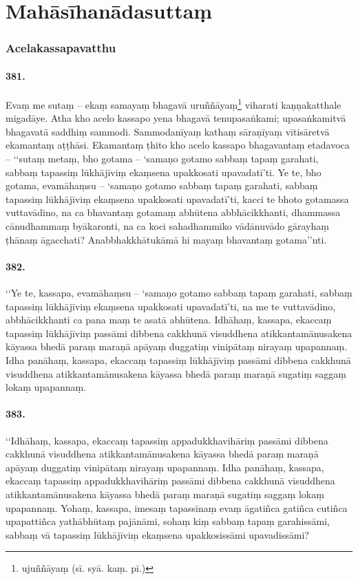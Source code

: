 \section{Mahāsīhanādasuttaṃ}

\subsubsection{Acelakassapavatthu}

\paragraph{381.} Evaṃ me sutaṃ – ekaṃ samayaṃ bhagavā uruññāyaṃ\footnote{ujuññāyaṃ (sī. syā. kaṃ. pī.)} viharati kaṇṇakatthale migadāye. Atha kho acelo kassapo yena bhagavā tenupasaṅkami; upasaṅkamitvā bhagavatā saddhiṃ sammodi. Sammodanīyaṃ kathaṃ sāraṇīyaṃ vītisāretvā ekamantaṃ aṭṭhāsi. Ekamantaṃ ṭhito kho acelo kassapo bhagavantaṃ etadavoca – ‘‘sutaṃ metaṃ, bho gotama – ‘samaṇo gotamo sabbaṃ tapaṃ garahati, sabbaṃ tapassiṃ lūkhājīviṃ ekaṃsena upakkosati upavadatī’ti. Ye te, bho gotama, evamāhaṃsu – ‘samaṇo gotamo sabbaṃ tapaṃ garahati, sabbaṃ tapassiṃ lūkhājīviṃ ekaṃsena upakkosati upavadatī’ti, kacci te bhoto gotamassa vuttavādino, na ca bhavantaṃ gotamaṃ abhūtena abbhācikkhanti, dhammassa cānudhammaṃ byākaronti, na ca koci sahadhammiko vādānuvādo gārayhaṃ ṭhānaṃ āgacchati? Anabbhakkhātukāmā hi mayaṃ bhavantaṃ gotama’’nti.

\paragraph{382.} ‘‘Ye te, kassapa, evamāhaṃsu – ‘samaṇo gotamo sabbaṃ tapaṃ garahati, sabbaṃ tapassiṃ lūkhājīviṃ ekaṃsena upakkosati upavadatī’ti, na me te vuttavādino, abbhācikkhanti ca pana maṃ te asatā abhūtena. Idhāhaṃ, kassapa, ekaccaṃ tapassiṃ lūkhājīviṃ passāmi dibbena cakkhunā visuddhena atikkantamānusakena kāyassa bhedā paraṃ maraṇā apāyaṃ duggatiṃ vinipātaṃ nirayaṃ upapannaṃ. Idha panāhaṃ, kassapa, ekaccaṃ tapassiṃ lūkhājīviṃ passāmi dibbena cakkhunā visuddhena atikkantamānusakena kāyassa bhedā paraṃ maraṇā sugatiṃ saggaṃ lokaṃ upapannaṃ.

\paragraph{383.} ‘‘Idhāhaṃ, kassapa, ekaccaṃ tapassiṃ appadukkhavihāriṃ passāmi dibbena cakkhunā visuddhena atikkantamānusakena kāyassa bhedā paraṃ maraṇā apāyaṃ duggatiṃ vinipātaṃ nirayaṃ upapannaṃ. Idha panāhaṃ, kassapa, ekaccaṃ tapassiṃ appadukkhavihāriṃ passāmi dibbena cakkhunā visuddhena atikkantamānusakena kāyassa bhedā paraṃ maraṇā sugatiṃ saggaṃ lokaṃ upapannaṃ. Yohaṃ, kassapa, imesaṃ tapassīnaṃ evaṃ āgatiñca gatiñca cutiñca upapattiñca yathābhūtaṃ pajānāmi, sohaṃ kiṃ sabbaṃ tapaṃ garahissāmi, sabbaṃ vā tapassiṃ lūkhājīviṃ ekaṃsena upakkosissāmi upavadissāmi?

